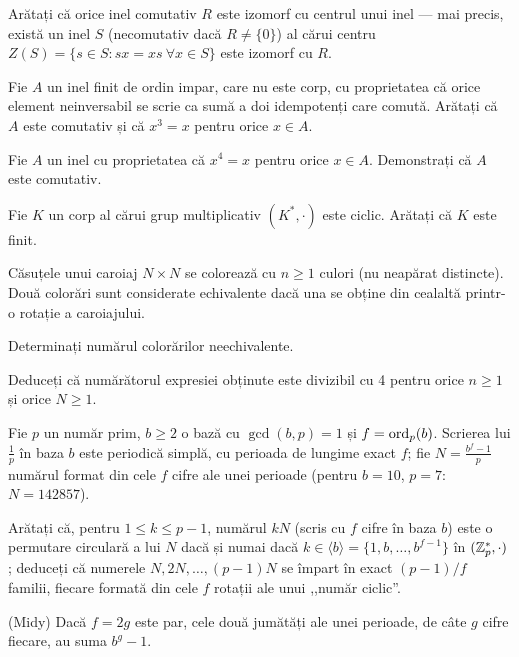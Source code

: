 \begin{problema}
Arătați că orice inel comutativ $R$ este izomorf cu centrul unui
inel --- mai precis, există un inel $S$ (necomutativ dacă $R\neq\{0\}$)
al cărui centru $Z(S)=\{s\in S : sx=xs\ \forall x\in S\}$ este izomorf cu
$R$.
\end{problema}

\begin{problema}
Fie $A$ un inel finit de ordin impar, care nu este corp, cu proprietatea
că orice element neinversabil se scrie ca sumă a doi idempotenți care
comută. Arătați că $A$ este comutativ și că $x^{3}=x$ pentru orice
$x\in A$.
\end{problema}

\begin{problema}
Fie $A$ un inel cu proprietatea că $x^{4}=x$ pentru orice $x\in A$.
Demonstrați că $A$ este comutativ.
\end{problema}

\begin{problema}
Fie $K$ un corp al cărui grup multiplicativ $(K^*,\cdot)$ este ciclic. Arătați că $K$ este finit.
\end{problema}

\begin{problema}[Clasică]
Căsuțele unui caroiaj $N \times N$ se colorează cu $n \ge 1$ culori (nu neapărat distincte). Două colorări sunt considerate echivalente dacă una se obține din cealaltă printr-o rotație a caroiajului.
\begin{parti}
\item Determinați numărul colorărilor neechivalente.
\item Deduceți că numărătorul expresiei obținute este divizibil cu 4 pentru orice $n \ge 1$ și orice $N \ge 1$.
\end{parti}
\end{problema}

\begin{problema}
Fie $p$ un număr prim, $b \ge 2$ o bază cu $\gcd(b,p) = 1$ și $f = \operatorname{ord}_p(b)$.
Scrierea lui $\frac{1}{p}$ în baza $b$ este periodică simplă, cu perioada de lungime
exact $f$; fie $N = \frac{b^f-1}{p}$ numărul format din cele $f$ cifre ale unei
perioade (pentru $b = 10$, $p = 7$: $N = 142857$).
\begin{parti}
  \item Arătați că, pentru $1 \le k \le p-1$, numărul $kN$ (scris cu $f$ cifre
    în baza $b$) este o permutare circulară a lui $N$ dacă și numai dacă
    $k \in \langle b \rangle = \{1, b, \dots, b^{f-1}\}$ în $(\mathbb{Z}_p^*, \cdot)$;
    deduceți că numerele $N, 2N, \dots, (p-1)N$ se împart în exact $(p-1)/f$
    familii, fiecare formată din cele $f$ rotații ale unui ,,număr ciclic''.
  \item (Midy) Dacă $f = 2g$ este par, cele două jumătăți ale unei perioade, de
    câte $g$ cifre fiecare, au suma $b^g - 1$.
\end{parti}
\end{problema}


